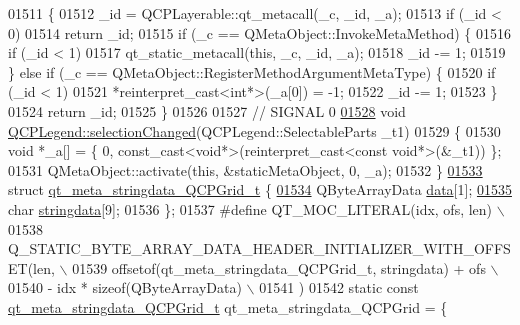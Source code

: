 \begin{DoxyCode}
01511 \{
01512     \_id = QCPLayerable::qt\_metacall(\_c, \_id, \_a);
01513     \textcolor{keywordflow}{if} (\_id < 0)
01514         \textcolor{keywordflow}{return} \_id;
01515     \textcolor{keywordflow}{if} (\_c == QMetaObject::InvokeMetaMethod) \{
01516         \textcolor{keywordflow}{if} (\_id < 1)
01517             qt\_static\_metacall(\textcolor{keyword}{this}, \_c, \_id, \_a);
01518         \_id -= 1;
01519     \} \textcolor{keywordflow}{else} \textcolor{keywordflow}{if} (\_c == QMetaObject::RegisterMethodArgumentMetaType) \{
01520         \textcolor{keywordflow}{if} (\_id < 1)
01521             *\textcolor{keyword}{reinterpret\_cast<}\textcolor{keywordtype}{int}*\textcolor{keyword}{>}(\_a[0]) = -1;
01522         \_id -= 1;
01523     \}
01524     \textcolor{keywordflow}{return} \_id;
01525 \}
01526 
01527 \textcolor{comment}{// SIGNAL 0}
\hypertarget{a00067_source_l01528}{}\hyperlink{a00045_a286149b644d5f5c884a0140219d979f6}{01528} \textcolor{keywordtype}{void} \hyperlink{a00045_a286149b644d5f5c884a0140219d979f6}{QCPLegend::selectionChanged}(QCPLegend::SelectableParts \_t1)
01529 \{
01530     \textcolor{keywordtype}{void} *\_a[] = \{ 0, \textcolor{keyword}{const\_cast<}\textcolor{keywordtype}{void}*\textcolor{keyword}{>}(\textcolor{keyword}{reinterpret\_cast<}\textcolor{keyword}{const }\textcolor{keywordtype}{void}*\textcolor{keyword}{>}(&\_t1)) \};
01531     QMetaObject::activate(\textcolor{keyword}{this}, &staticMetaObject, 0, \_a);
01532 \}
\hypertarget{a00067_source_l01533}{}\hyperlink{a00067}{01533} \textcolor{keyword}{struct }\hyperlink{a00067_de/db1/a00197}{qt\_meta\_stringdata\_QCPGrid\_t} \{
\hypertarget{a00067_source_l01534}{}\hyperlink{a00067_a7e6e5bd7ca3eb3f18073d11e635e5cb9}{01534}     QByteArrayData \hyperlink{a00067_a7e6e5bd7ca3eb3f18073d11e635e5cb9}{data}[1];
\hypertarget{a00067_source_l01535}{}\hyperlink{a00067_a0bcd248c91a252f9ad93a353181ea07e}{01535}     \textcolor{keywordtype}{char} \hyperlink{a00067_a0bcd248c91a252f9ad93a353181ea07e}{stringdata}[9];
01536 \};
01537 \textcolor{preprocessor}{#define QT\_MOC\_LITERAL(idx, ofs, len) \(\backslash\)}
01538 \textcolor{preprocessor}{    Q\_STATIC\_BYTE\_ARRAY\_DATA\_HEADER\_INITIALIZER\_WITH\_OFFSET(len, \(\backslash\)}
01539 \textcolor{preprocessor}{    offsetof(qt\_meta\_stringdata\_QCPGrid\_t, stringdata) + ofs \(\backslash\)}
01540 \textcolor{preprocessor}{        - idx * sizeof(QByteArrayData) \(\backslash\)}
01541 \textcolor{preprocessor}{    )}
01542 \textcolor{keyword}{static} \textcolor{keyword}{const} \hyperlink{a00067_de/db1/a00197}{qt\_meta\_stringdata\_QCPGrid\_t} qt\_meta\_stringdata\_QCPGrid = \{

\end{DoxyCode}

